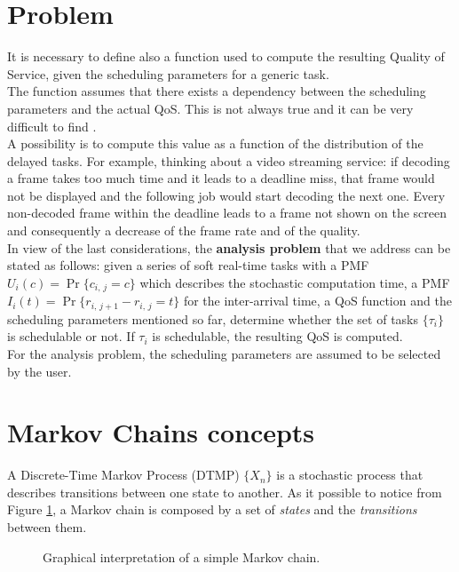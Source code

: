 \section{Problem}
It is necessary to define also a function used to compute the resulting Quality of Service, given the scheduling parameters for a generic task.\\
The function assumes that there exists a dependency between the scheduling parameters and the actual QoS. This is not always true and it can be very difficult to find \cite{prosit}.\\
A possibility is to compute this value as a function of the distribution of the delayed tasks. For example, thinking about a video streaming service: if decoding a frame takes too much time and it leads to a deadline miss, that frame would not be displayed and the following job would start decoding the next one. Every non-decoded frame within the deadline leads to a frame not shown on the screen and consequently a decrease of the frame rate and of the quality.\\
In view of the last considerations, the \textbf{analysis problem} that we address can be stated as follows: given a series of soft real-time tasks with a PMF \( U_{i}(c) = \Pr\{c_{i,\,j} = c\} \) which describes the stochastic computation time, a PMF \( I_{i}(t) = \Pr\{r_{i,\,j+1}-r_{i,\,j} = t\} \) for the inter-arrival time, a QoS function and the scheduling parameters mentioned so far, determine whether the set of tasks \( \{\tau_{i}\} \) is schedulable or not. If \( \tau_{i} \) is schedulable, the resulting QoS is computed.\\
For the analysis problem, the scheduling parameters are assumed to be selected by the user.

\section{Markov Chains concepts} \label{mcconcepts}
A Discrete-Time Markov Process (DTMP) \( \{X_{n}\} \) is a stochastic process that describes transitions between one state to another. As it possible to notice from Figure \ref{automaton}, a Markov chain is composed by a set of \emph{states} and the \emph{transitions} between them.
\begin{figure}[H]
  \caption{Graphical interpretation of a simple Markov chain.}
  \label{automaton}
\end{figure}

